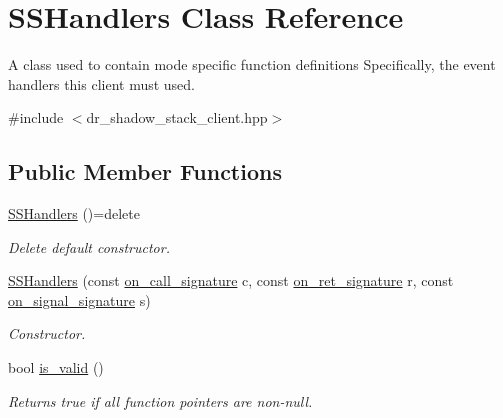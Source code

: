 \hypertarget{class_s_s_handlers}{}\section{S\+S\+Handlers Class Reference}
\label{class_s_s_handlers}


A class used to contain mode specific function definitions Specifically, the event handlers this client must used.  




{\ttfamily \#include $<$dr\+\_\+shadow\+\_\+stack\+\_\+client.\+hpp$>$}

\subsection*{Public Member Functions}
\begin{DoxyCompactItemize}
\item 
\hyperlink{class_s_s_handlers_aa6983716a948c14c3bd9de8449b418fc}{S\+S\+Handlers} ()=delete
\begin{DoxyCompactList}\small\item\em Delete default constructor. \end{DoxyCompactList}\item 
\hyperlink{class_s_s_handlers_a58d41cd44d4d7a9eb32592ec7b387024}{S\+S\+Handlers} (const \hyperlink{class_s_s_handlers_ac55de17666a40e5d50d854ef65f01be9}{on\+\_\+call\+\_\+signature} c, const \hyperlink{class_s_s_handlers_ade1360265360f4e67c782a00951850ab}{on\+\_\+ret\+\_\+signature} r, const \hyperlink{class_s_s_handlers_a63287bfa685457954f9bed08635dca2d}{on\+\_\+signal\+\_\+signature} s)
\begin{DoxyCompactList}\small\item\em Constructor. \end{DoxyCompactList}\item 
bool \hyperlink{class_s_s_handlers_a05e004a25c6cd0bcf0b1958ddf1799a4}{is\+\_\+valid} ()
\begin{DoxyCompactList}\small\item\em Returns true if all function pointers are non-\/null. \end{DoxyCompactList}\end{DoxyCompactItemize}
